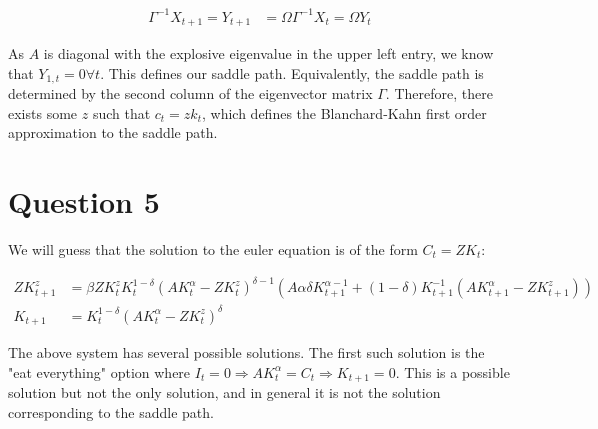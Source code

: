 \documentclass[11pt]{article} %
\begin{document}
\begin{align*}
\Gamma^{-1} X_{t+1} = Y_{t+1} &= \Omega\Gamma^{-1} X_{t} = \Omega Y_{t}
\end{align*}

As $A$ is diagonal with the explosive eigenvalue in the upper left entry, we know that $Y_{1,t} = 0 \forall t$. This defines our saddle path. Equivalently, the saddle path is determined by the second column of the eigenvector matrix $\Gamma$. Therefore, there exists some $z$ such that $c_t = z k_t$, which defines the Blanchard-Kahn first order approximation to the saddle path.

\section{Question 5}
We will guess that the solution to the euler equation is of the form $C_t = ZK_t$:

\begin{align*}
ZK_{t+1}^z&= \beta  ZK_t^{z} K_t^{1-\delta}(AK_t^{\alpha} -  ZK_t^{z})^{\delta - 1}(A\alpha \delta K_{t+1}^{\alpha - 1}  + (1-\delta)K_{t+1}^{-1}(AK_{t+1}^{\alpha} -  ZK_{t+1}^{z}) )\\
K_{t+1} &= K_t^{1-\delta}(AK_t^{\alpha} -  ZK_t^{z})^{\delta}
\end{align*}

The above system has several possible solutions. The first such solution is the "eat everything" option where $I_t = 0 \Rightarrow AK_{t}^{\alpha} = C_t \Rightarrow K_{t+1} = 0$. This is a possible solution but not the only solution, and in general it is not the solution corresponding to the saddle path.
\end{document}
